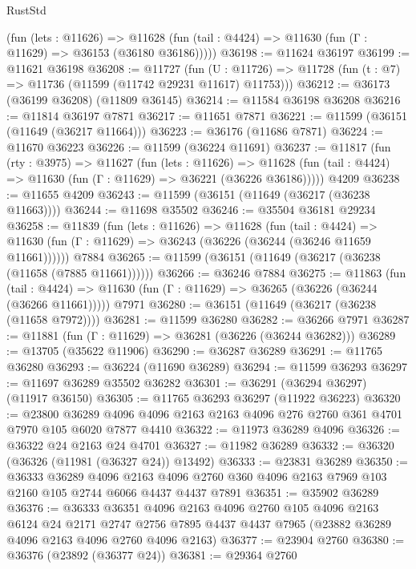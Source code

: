 \begin{lexlean}{RustStd}
\begin{coremodule}
      (fun (lets : @11626) =>
      @11628 (fun (tail : @4424) => @11630 (fun (Γ : @11629) => @36153 (@36180 @36186)))))
@36198 := @11624 @36197
@36199 := @11621 @36198
@36208 := @11727
    (fun (U : @11726) => @11728 (fun (t : @7) => @11736 (@11599 (@11742 @29231 @11617) @11753)))
@36212 := @36173 (@36199 @36208) (@11809 @36145)
@36214 := @11584 @36198 @36208
@36216 := @11814 @36197 @7871
@36217 := @11651 @7871
@36221 := @11599 (@36151 (@11649 (@36217 @11664)))
@36223 := @36176 (@11686 @7871)
@36224 := @11670 @36223
@36226 := @11599 (@36224 @11691)
@36237 := @11817
    (fun (rty : @3975) =>
    @11627
      (fun (lets : @11626) =>
      @11628 (fun (tail : @4424) => @11630 (fun (Γ : @11629) => @36221 (@36226 @36186)))))
    @4209
@36238 := @11655 @4209
@36243 := @11599 (@36151 (@11649 (@36217 (@36238 @11663))))
@36244 := @11698 @35502
@36246 := @35504 @36181 @29234
@36258 := @11839
    (fun (lets : @11626) =>
    @11628
      (fun (tail : @4424) =>
      @11630 (fun (Γ : @11629) => @36243 (@36226 (@36244 (@36246 @11659 @11661))))))
    @7884
@36265 := @11599 (@36151 (@11649 (@36217 (@36238 (@11658 (@7885 @11661))))))
@36266 := @36246 @7884
@36275 := @11863
    (fun (tail : @4424) => @11630 (fun (Γ : @11629) => @36265 (@36226 (@36244 (@36266 @11661)))))
    @7971
@36280 := @36151 (@11649 (@36217 (@36238 (@11658 @7972))))
@36281 := @11599 @36280
@36282 := @36266 @7971
@36287 := @11881 (fun (Γ : @11629) => @36281 (@36226 (@36244 @36282)))
@36289 := @13705 (@35622 @11906)
@36290 := @36287 @36289
@36291 := @11765 @36280
@36293 := @36224 (@11690 @36289)
@36294 := @11599 @36293
@36297 := @11697 @36289 @35502 @36282
@36301 := @36291 (@36294 @36297) (@11917 @36150)
@36305 := @11765 @36293 @36297 (@11922 @36223)
@36320 := @23800
    @36289
    @4096
    @4096
    @2163
    @2163
    @4096
    @276
    @2760
    @361
    @4701
    @7970
    @105
    @6020
    @7877
    @4410
@36322 := @11973 @36289 @4096
@36326 := @36322 @24 @2163 @24 @4701
@36327 := @11982 @36289
@36332 := @36320 (@36326 (@11981 (@36327 @24)) @13492)
@36333 := @23831 @36289
@36350 := @36333
    @36289
    @4096
    @2163
    @4096
    @2760
    @360
    @4096
    @2163
    @7969
    @103
    @2160
    @105
    @2744
    @6066
    @4437
    @4437
    @7891
@36351 := @35902 @36289
@36376 := @36333
    @36351
    @4096
    @2163
    @4096
    @2760
    @105
    @4096
    @2163
    @6124
    @24
    @2171
    @2747
    @2756
    @7895
    @4437
    @4437
    @7965
    (@23882 @36289 @4096 @2163 @4096 @2760 @4096 @2163)
@36377 := @23904 @2760
@36380 := @36376 (@23892 (@36377 @24))
@36381 := @29364 @2760

\end{coremodule}
\end{lexlean}
